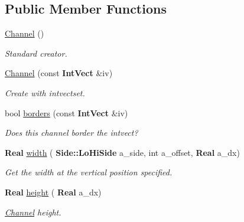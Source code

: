 \subsection*{Public Member Functions}
\begin{DoxyCompactItemize}
\item 
\mbox{\label{class_channel_af2b4b16288cbb2c592b1e0f6486c2430}} 
\hyperlink{class_channel_af2b4b16288cbb2c592b1e0f6486c2430}{Channel} ()
\begin{DoxyCompactList}\small\item\em Standard creator. \end{DoxyCompactList}\item 
\mbox{\label{class_channel_a80cbe21d69e3b524a126b5a0665ecffc}} 
\hyperlink{class_channel_a80cbe21d69e3b524a126b5a0665ecffc}{Channel} (const \textbf{ Int\+Vect} \&iv)
\begin{DoxyCompactList}\small\item\em Create with intvectset. \end{DoxyCompactList}\item 
\mbox{\label{class_channel_a7de646c5752623df873facb0172ceb25}} 
bool \hyperlink{class_channel_a7de646c5752623df873facb0172ceb25}{borders} (const \textbf{ Int\+Vect} \&iv)
\begin{DoxyCompactList}\small\item\em Does this channel border the intvect? \end{DoxyCompactList}\item 
\mbox{\label{class_channel_af98ac8c6c72edc3b8591bd0e043a2aa2}} 
\textbf{ Real} \hyperlink{class_channel_af98ac8c6c72edc3b8591bd0e043a2aa2}{width} (\textbf{ Side\+::\+Lo\+Hi\+Side} a\+\_\+side, int a\+\_\+offset, \textbf{ Real} a\+\_\+dx)
\begin{DoxyCompactList}\small\item\em Get the width at the vertical position specified. \end{DoxyCompactList}\item 
\mbox{\label{class_channel_ab65c9b664c6772a0dd9d08cc0215030c}} 
\textbf{ Real} \hyperlink{class_channel_ab65c9b664c6772a0dd9d08cc0215030c}{height} (\textbf{ Real} a\+\_\+dx)
\begin{DoxyCompactList}\small\item\em \hyperlink{class_channel}{Channel} height. \end{DoxyCompactList}\item 

\end{DoxyCompactItemize}

